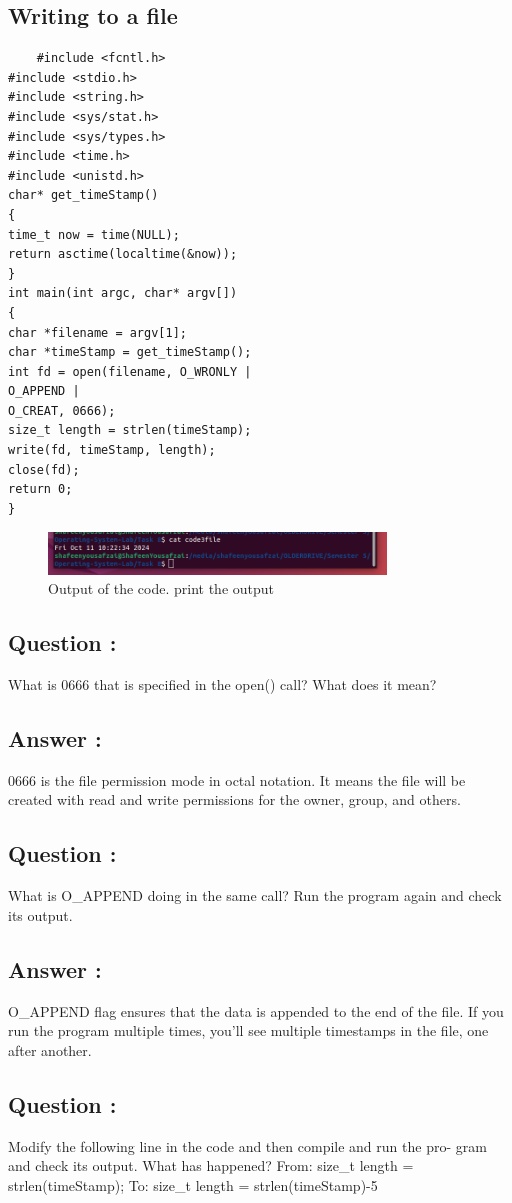 \documentclass[12pt]{article}
\begin{document}
\subsection{Writing to a file}
\begin{verbatim}
    #include <fcntl.h>
#include <stdio.h>
#include <string.h>
#include <sys/stat.h>
#include <sys/types.h>
#include <time.h>
#include <unistd.h>
char* get_timeStamp()
{
time_t now = time(NULL);
return asctime(localtime(&now));
}
int main(int argc, char* argv[])
{
char *filename = argv[1];
char *timeStamp = get_timeStamp();
int fd = open(filename, O_WRONLY |
O_APPEND |
O_CREAT, 0666);
size_t length = strlen(timeStamp);
write(fd, timeStamp, length);
close(fd);
return 0;
}

\end{verbatim}
\begin{figure}[H]
    \centering
    \includegraphics[width=0.8\textwidth]{1.png}
    \caption{Output of the code. print the output}
    \label{fig:enter-label}
\end{figure}
\subsection{Question : }
What is 0666 that is specified in the open()
call? What does it mean?
\subsection{Answer : }
0666 is the file permission mode in octal notation. It means the file will be
created with read and write permissions for the owner, group, and others.

\subsection{Question : }
What is O\_APPEND doing in the same call?
Run the program again and check its output.
\subsection{Answer : }
O\_APPEND flag ensures that the data is appended to
the end of the file. If you run the program multiple times, you’ll see multiple
timestamps in the file, one after another.

\subsection{Question : }
Modify the following line in the code and then compile and run the pro-
gram and check its output. What has happened? From: size\_t length =
strlen(timeStamp); To: size\_t length = strlen(timeStamp)-5
\end{document}
